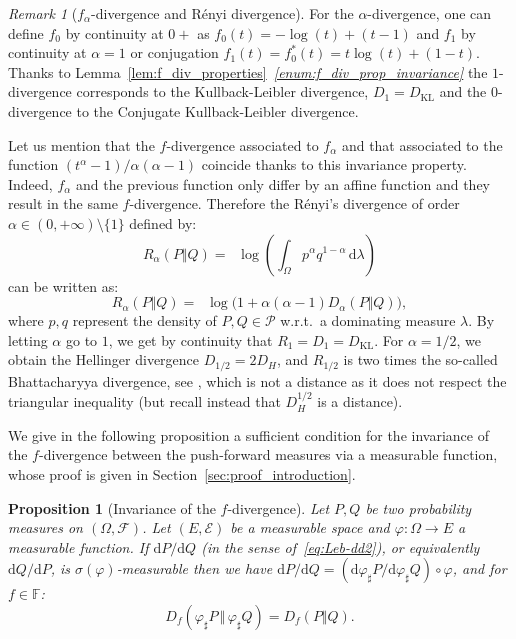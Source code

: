 \documentclass[12pt]{article}
\newcommand{\ce}{{\mathcal E}}
\newcommand{\cf}{{\mathcal F}}
\newcommand{\cp}{{\mathcal P}}
\newcommand{\F}{{\mathbb F}}
\newcommand{\inv}[1]{\mathop{\frac{1}{#1}}\nolimits}
\newcommand{\rd}{\mathrm{d}}
\theoremstyle{plain}
\newtheorem{prop}[theo]{Proposition}
\theoremstyle{remark}
\newtheorem{rem}{Remark}
\begin{document}
\begin{rem}[$f_\alpha$-divergence and Rényi divergence]
   \label{rem:renyi-div}
   For the $\alpha$-divergence, one can define $f_0$ by continuity at
   $0+$ as $f_0(t)=-\log (t) + (t-1)$ and $f_1$ by continuity at $\alpha=1$ or
   conjugation   $f_1(t)=f_0^*(t)=t\log(t)    +   (1-t)$.    Thanks   to
   Lemma~\ref{lem:f_div_properties}{\it ~\ref{enum:f_div_prop_invariance}} the
   $1$-divergence  corresponds   to  the   Kullback-Leibler  divergence,
   $D_1=D_\mathrm{KL}$   and  the   $0$-divergence   to  the   Conjugate
   Kullback-Leibler divergence.

Let us mention that  the
$f$-divergence associated to $f_\alpha$ and that associated to the function $(t^\alpha -1)/\alpha (\alpha-1)$
coincide thanks to this invariance property. Indeed, $f_\alpha$ and the previous function only differ by an
affine function and they result in the same $f$-divergence. Therefore the  Rényi's divergence
\cite{renyi1961measures} of order
 $\alpha \in (0,+\infty )\setminus \{1\}$ defined by:
 \[
R_\alpha(P\Vert Q) =
\inv{\alpha-1} \log \left( \int_\Omega p^\alpha q^{1-\alpha} \, \rd
  \lambda \right)
 \]
can be written as:
\begin{equation*}
R_\alpha(P\Vert Q)= \inv{\alpha-1} \log \Big( 1+ \alpha(\alpha-1)
  D_{\alpha} (P\Vert Q)\Big),
\end{equation*}
where $p,q$ represent the density of $P, Q\in \cp$ w.r.t.\ a dominating
measure $\lambda$.
By  letting   $\alpha$  go  to  $1$,  we   get  by   continuity  that
$R_1 =D_1 = D_\mathrm{KL}$.  For $\alpha=1/2$, we obtain the  Hellinger
divergence  $D_{1/2}= 2 D_H$,  and $R_{1/2}  $ is  two times  the so-called
Bhattacharyya divergence, see \cite{kailath2003divergence}, which is not a
distance   as  it  does  not  respect  the  triangular
inequality  (but  recall  instead  that $D_H^{1/2}$  is  a  distance).
\end{rem}







We give in  the  following proposition a sufficient condition for the
invariance of the $f$-divergence between the push-forward measures via a measurable function,
whose      proof     is      given  in Section~\ref{sec:proof_introduction}.

\begin{prop}[Invariance of the $f$-divergence]
  \label{prop:inv-gen}
    Let $P,Q$ be two probability measures on $(\Omega, \cf)$. Let $(E, \ce)$
    be a measurable space and $\varphi: \Omega \rightarrow E$ a measurable
    function. If $\rd P/\rd Q$ (in the
    sense of~\eqref{eq:Leb-dd2}), or equivalently $\rd Q/ \rd P$, is
    $\sigma(\varphi)$-measurable then we have  $\rd P/
    \rd Q= (\rd  \varphi _\sharp P/ \rd \varphi_\sharp Q)\circ \varphi$,
    and  for $f\in \F$:
    \[
      D_f(\varphi_\sharp P \, \Vert \, \varphi_ \sharp Q) =  D_f(P \Vert Q).
    \]
\end{prop}
\end{document}
